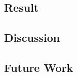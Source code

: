 \documentclass{article}
\begin{document}
    \subsection{Result}

    \subsection{Discussion}

    \subsection{Future Work}


\pagebreak

% 

\pagebreak

\end{document}
